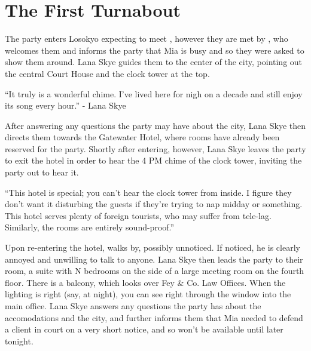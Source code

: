 \section{The First Turnabout}
The party enters Losokyo expecting to meet , however they are met by , who welcomes them and informs the party that Mia is busy and so they were asked to show them around. Lana Skye guides them to the center of the city, pointing out the central Court House and the clock tower at the top. 
\begin{center}
``It truly is a wonderful chime. I've lived here for nigh on a decade and still enjoy its song every hour.''
- Lana Skye \end{center}

After answering any questions the party may have about the city, Lana Skye then directs them towards the Gatewater Hotel, where rooms have already been reserved for the party. Shortly after entering, however, Lana Skye leaves the party to exit the hotel in order to hear the 4 PM chime of the clock tower, inviting the party out to hear it.

\begin{center}
``This hotel is special; you can't hear the clock tower from inside. I figure they don't want it disturbing the guests if they're trying to nap midday or something. This hotel serves plenty of foreign tourists, who may suffer from tele-lag. Similarly, the rooms are entirely sound-proof.''
\end{center}

Upon re-entering the hotel,  walks by, possibly unnoticed. If noticed, he is clearly annoyed and unwilling to talk to anyone. Lana Skye then leads the party to their room, a suite with N bedrooms on the side of a large meeting room on the fourth floor. There is a balcony, which looks over Fey \& Co. Law Offices. When the lighting is right (say, at night), you can see right through the window into the main office. Lana Skye answers any questions the party has about the accomodations and the city, and further informs them that Mia needed to defend a client in court on a very short notice, and so won't be available until later tonight.

